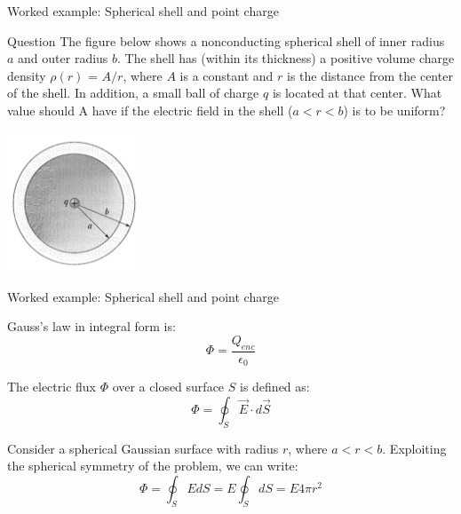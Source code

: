 {
\problemslide

%
%
%

\begin{frame}{Worked example: Spherical shell and point charge}

  \begin{blockexmplque}{Question}
    The figure below shows
    a nonconducting spherical shell of
    inner radius $a$ and outer radius $b$.
    The shell has (within its thickness) a positive volume charge density
    $\rho(r)$ = $A/r$,
    where $A$ is a constant and $r$ is the distance from the center of the shell.
    In addition, a small ball of charge $q$ is located at that center.
    What value should A have if the electric field in the shell
    ($a < r < b$) is to be uniform?
    \begin{center}
      \includegraphics[width=0.30\textwidth]{./images/problems/lect02_thick_spherical_shell_and_central_charge}
    \end{center}
  \end{blockexmplque}

\end{frame}

%
%
%

\begin{frame}{Worked example: Spherical shell and point charge}

  Gauss's law in integral form is:
  \begin{equation*}
  	 \Phi = \frac{Q_{enc}}{\epsilon_0}
  \end{equation*}

  The electric flux $\Phi$ over a closed surface $S$ is defined as:
  \begin{equation*}
  	 \Phi = \oint_{S} \vec{E} \cdot d\vec{S}
  \end{equation*}

  Consider a spherical Gaussian surface with radius $r$, where $a < r < b$.
  Exploiting the spherical symmetry of the problem, we can write:
  \begin{equation*}
  	 \Phi = \oint_{S} E dS = E \oint_{S} dS = E 4\pi r^2
  \end{equation*}


\end{frame}}
